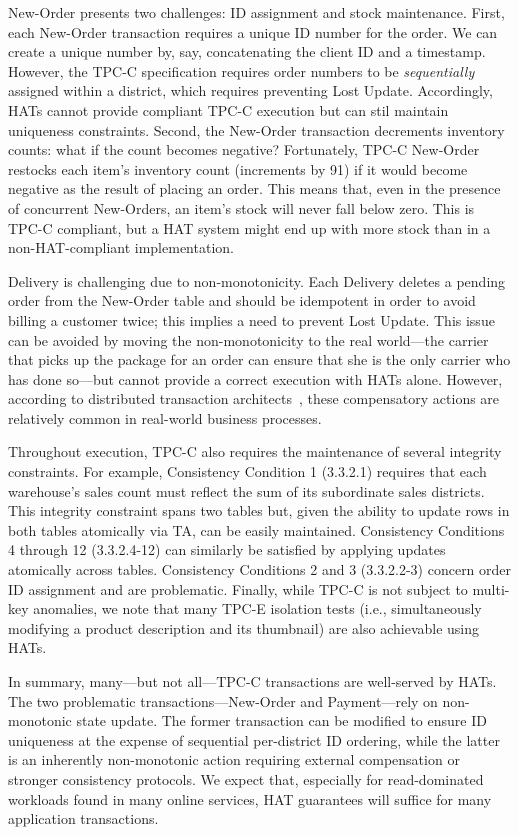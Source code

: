 New-Order presents two challenges: ID assignment and stock
maintenance. First, each New-Order transaction requires a unique ID
number for the order. We can create a unique number by, say,
concatenating the client ID and a timestamp. However, the TPC-C
specification requires order numbers to be \textit{sequentially}
assigned within a district, which requires preventing Lost
Update. Accordingly, HATs cannot provide compliant TPC-C execution but
can stil maintain uniqueness constraints. Second, the New-Order transaction
decrements inventory counts: what if the count becomes negative?
Fortunately, TPC-C New-Order restocks each item's inventory count
(increments by 91) if it would become negative as the result of
placing an order. This means that, even in the presence of concurrent
New-Orders, an item's stock will never fall below zero. This is TPC-C
compliant, but a HAT system might end up with more stock
than in a non-HAT-compliant implementation.

Delivery is challenging due to non-monotonicity. Each Delivery deletes
a pending order from the New-Order table and should be idempotent in
order to avoid billing a customer twice; this implies a need to
prevent Lost Update. This issue  can be avoided  by moving the
non-monotonicity to the real world---the carrier that picks up the
package for an order can ensure that she is the only carrier who has
done so---but cannot provide a correct execution with HATs
alone. However, according to distributed transaction
architects~\cite{entitygroup}, these compensatory actions are
relatively common in real-world business processes.

Throughout execution, TPC-C also requires the maintenance of several
integrity constraints. For example, Consistency Condition 1 (3.3.2.1)
requires that each warehouse's sales count must reflect the sum of its
subordinate sales districts. This integrity constraint spans two
tables but, given the ability to update rows in both tables atomically
via TA, can be easily maintained. Consistency Conditions 4 through 12
(3.3.2.4-12) can similarly be satisfied by applying updates atomically
across tables. Consistency Conditions 2 and 3 (3.3.2.2-3) concern
order ID assignment and are problematic. Finally, while TPC-C is not
subject to multi-key anomalies, we note that many TPC-E isolation
tests (i.e., simultaneously modifying a product description and its
thumbnail) are also achievable using HATs.

In summary, many---but not all---TPC-C transactions are well-served by
HATs. The two problematic transactions---New-Order and Payment---rely
on non-monotonic state update. The former transaction can be modified
to ensure ID uniqueness at the expense of sequential per-district ID
ordering, while the latter is an inherently non-monotonic action
requiring external compensation or stronger consistency protocols. We
expect that, especially for read-dominated workloads found in many
online services, HAT guarantees will suffice for many application
transactions.

